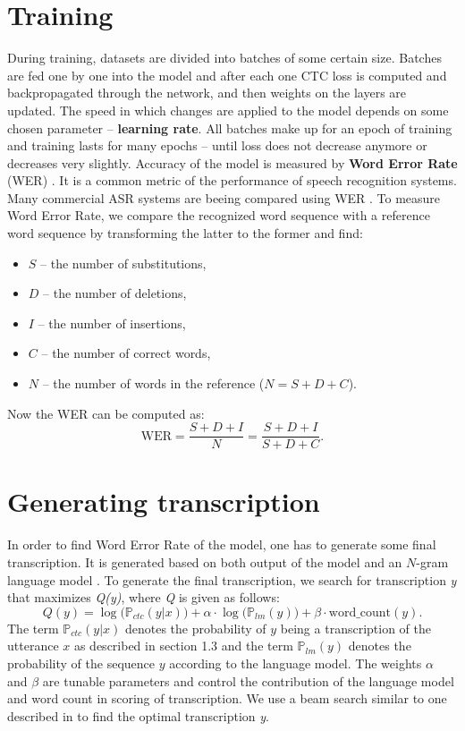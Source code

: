 \documentclass[licencjacka,en]{pracamgr}
\begin{document}
	\section{Training} \label{sec:trainig}
	During training, datasets are divided into batches of some certain size. Batches are fed one by one into the model and after each one CTC loss is computed and backpropagated through the network, and then weights on the layers are updated. The speed in which changes are applied to the model depends on some chosen parameter -- \textbf{learning rate}. All batches make up for an epoch of training and training lasts for many epochs -- until loss does not decrease anymore or decreases very slightly.
	Accuracy of the model is measured by \textbf{Word Error Rate} (WER) \cite{DS1}. It is a common metric of the performance of speech recognition systems. Many commercial ASR systems are beeing compared using WER \cite{DS8}. To measure Word Error Rate, we compare the recognized word sequence with a reference word sequence by transforming the latter to the former and find:
	
	\begin{itemize}
		\item $S$ -- the number of substitutions,
		\item $D$ -- the number of deletions,
		\item $I$ -- the number of insertions,
		\item $C$ -- the number of correct words,
		\item $N$ -- the number of words in the reference ($N=S+D+C$).
	\end{itemize}
	Now the WER can be computed as:
	$$
	\text{WER} = \frac{S + D + I}{N} = \frac{S + D + I}{S + D + C}.
	$$
	
	\section{Generating transcription} \label{sec:transcription}
	In order to find Word Error Rate of the model, one has to generate some final transcription. It is generated based on both output of the model and an $N$-gram language model \cite{DS9}. To generate the final transcription, we search for transcription \textit{y} that maximizes \textit{Q(y)}, where \textit{Q} is given as follows:
	$$
	Q(y) = \log \big(\mathbb{P}_{ctc}(y|x)\big) + \alpha \cdot \log \big( \mathbb{P}_{lm}(y) \big) + \beta \cdot \text{word\_count}(y).
	$$
	The term $\mathbb{P}_{ctc}(y|x)$ denotes the probability of $y$ being a transcription of the utterance $x$ as described in section 1.3 and the term $\mathbb{P}_{lm}(y)$ denotes the probability of the sequence $y$ according to the language model. The weights $\alpha$ and $\beta$ are tunable parameters and control the contribution of the language model and word count in scoring of transcription. We use a beam search similar to one described in \cite{DS7} to find the optimal transcription \textit{y}.
	
\end{document}
